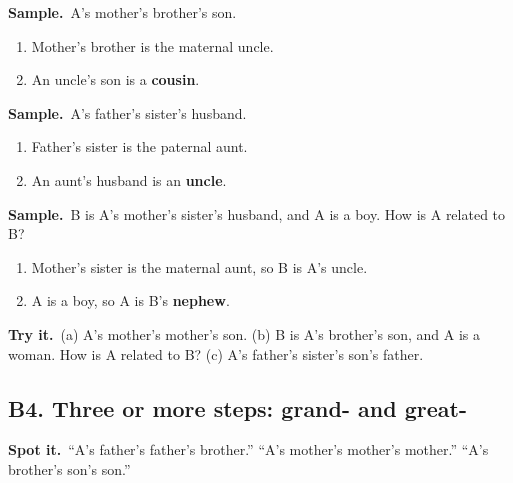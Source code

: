 \documentclass[11pt,a4paper]{article}
\let\oldsubsection\subsection
\renewcommand{\subsection}{\needspace{9\baselineskip}\oldsubsection}
\newcommand{\spot}{\textbf{\color{ember}Spot it.}\ }
\newif\ifkeepsamp
\newcommand{\samp}{\ifkeepsamp\needspace{4\baselineskip}\fi\textbf{\color{ember}Sample.}\ }
\newcommand{\tryit}[1]{\textbf{\color{ember}Try it.}\ #1}
\begin{document}
\samp A's mother's brother's son.
\begin{enumerate}
\item Mother's brother is the maternal uncle.
\item An uncle's son is a \textbf{cousin}.
\end{enumerate}
\samp A's father's sister's husband.
\begin{enumerate}
\item Father's sister is the paternal aunt.
\item An aunt's husband is an \textbf{uncle}.
\end{enumerate}
\samp B is A's mother's sister's husband, and A is a boy. How is A related to B?
\begin{enumerate}
\item Mother's sister is the maternal aunt, so B is A's uncle.
\item A is a boy, so A is B's \textbf{nephew}.
\end{enumerate}

\tryit (a) A's mother's mother's son. (b) B is A's brother's son, and A is a woman. How is A related to B? (c) A's father's sister's son's father.

\subsection{B4. Three or more steps: grand- and great-}
\spot ``A's father's father's brother.'' ``A's mother's mother's mother.'' ``A's brother's son's son.''
\end{document}
